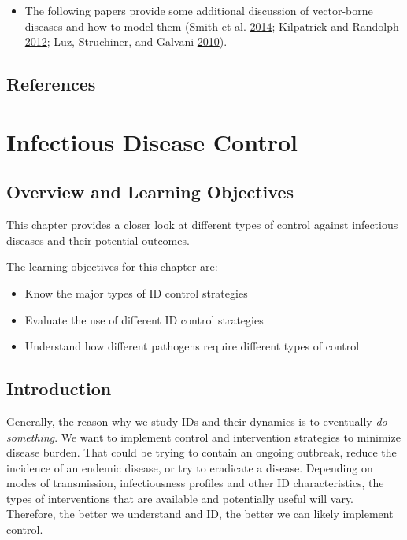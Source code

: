\documentclass[]{book}
\providecommand{\tightlist}{%
  \setlength{\itemsep}{0pt}\setlength{\parskip}{0pt}}
\theoremstyle{definition}
\theoremstyle{definition}
\theoremstyle{definition}
\theoremstyle{remark}
\begin{document}
\begin{itemize}
\tightlist
\item
  The following papers provide some additional discussion of
  vector-borne diseases and how to model them (Smith et al.
  \protect\hyperlink{ref-smith14}{2014}; Kilpatrick and Randolph
  \protect\hyperlink{ref-kilpatrick12}{2012}; Luz, Struchiner, and
  Galvani \protect\hyperlink{ref-luz10}{2010}).
\end{itemize}

\section{References}\label{references-8}

\chapter{Infectious Disease Control}\label{infectious-disease-control}

\section{Overview and Learning
Objectives}\label{overview-and-learning-objectives-8}

This chapter provides a closer look at different types of control
against infectious diseases and their potential outcomes.

The learning objectives for this chapter are:

\begin{itemize}
\tightlist
\item
  Know the major types of ID control strategies
\item
  Evaluate the use of different ID control strategies
\item
  Understand how different pathogens require different types of control
\end{itemize}

\section{Introduction}\label{introduction-8}

Generally, the reason why we study IDs and their dynamics is to
eventually \emph{do something}. We want to implement control and
intervention strategies to minimize disease burden. That could be trying
to contain an ongoing outbreak, reduce the incidence of an endemic
disease, or try to eradicate a disease. Depending on modes of
transmission, infectiousness profiles and other ID characteristics, the
types of interventions that are available and potentially useful will
vary. Therefore, the better we understand and ID, the better we can
likely implement control.
\end{document}
